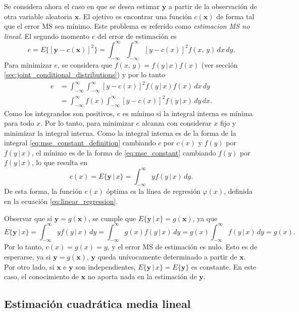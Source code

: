 \documentclass[a4paper]{report}
\newcommand{\x}{\mathbf{x}}
\newcommand{\y}{\mathbf{y}}
\begin{document}
Se considera ahora el caso en que se desea estimar \(\y\) a partir de la observación de otra variable aleatoria \(\x\). El ojetivo es encontrar una función \(c(\x)\) de forma tal que el error MS sea mínimo. Este problema es referido como \emph{estimacion MS no lineal}. El segundo momento \(e\) del error de estimación es
\[
 e=E\{[\y-c(\x)]^2\}=\int_{-\infty}^{\infty}\int_{-\infty}^{\infty}[y-c(x)]^2f(x,\,y)\,dx\,dy.
\]
Para minimizar \(e\), se considera que \(f(x,\,y)=f(y\,|\,x)f(x)\) (ver sección \ref{sec:joint_conditional_distributions}) y por lo tanto
\begin{align*}
  e&=\int_{-\infty}^{\infty}\int_{-\infty}^{\infty}[y-c(x)]^2f(y\,|\,x)f(x)\,dx\,dy\\
   &=\int_{-\infty}^{\infty}f(x)\int_{-\infty}^{\infty}[y-c(x)]^2f(y\,|\,x)\,dy\,dx.
\end{align*}
Como los integrandos son positivos, \(e\) es mínimo si la integral interna es mínima para todo \(x\). Por lo tanto, para minimizar \(e\) alcanza con considerar \(x\) fijo y minimizar la integral interna. Como la integral interna es de la forma de la integral \ref{eq:mse_constant_definition} cambiando \(c\) por \(c(x)\) y \(f(y)\) por \(f(y\,|\,x)\), el mínimo es de la forma de \ref{eq:mse_constant} cambiando \(f(y)\) por \(f(y\,|\,x)\), lo que resulta en
\begin{equation}\label{eq:mse_nonlinear}
 c(x)=E\{\y\,|\,x\}=\int_{-\infty}^{\infty}yf(y\,|\,x)\,dy.
\end{equation}
De esta forma, la función \(c(x)\) óptima es la línea de regresión \(\varphi(x)\), definida en la ecuación \ref{eq:linear_regression}.

Observar que si \(\y=g(\x)\), se cumple que \(E\{\y\,|\,x\}=g(\x)\), ya que
\small
\[
 E\{\y\,|\,x\}=\int_{-\infty}^{\infty}yf(y\,|\,x)\,dy=\int_{-\infty}^{\infty}g(x)f(y\,|\,x)\,dy=g(x)\int_{-\infty}^{\infty}f(y\,|\,x)\,dy=g(x).
\]
\normalsize
Por lo tanto, \(c(x)=g(x)=y\), y el error MS de estimación es nulo. Esto es de esperarse, ya si \(\y=g(\x)\), \(\y\) queda unívocamente determinado a partir de \(\x\). Por otro lado, si \(\x\) e \(\y\) son independientes, \(E\{\y\,|\,x\}=E\{\y\}\) es constante. En este caso, el conocimiento de \(\x\) no aporta nada en la estimación de \(\y\).

\subsection{Estimación cuadrática media lineal}
\end{document}
